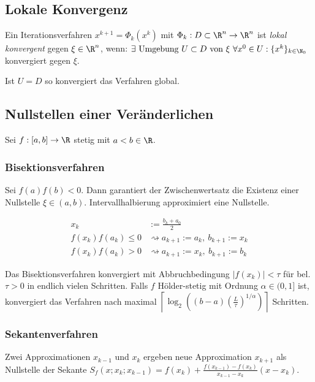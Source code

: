 \subsection*{Lokale Konvergenz}

Ein Iterationsverfahren $x^{k+1} = \Phi_k(x^k)$ mit $\Phi_k : D \subset \R^n \to \R^n$ ist \emph{lokal konvergent} gegen $\xi \in \R^n$, wenn: $\exists \text{ Umgebung } U \subset D \text{ von } \xi \ \forall x^0 \in U : \{x^k\}_{k\in\N_0}$ konvergiert gegen $\xi$.

Ist $U = D$ so konvergiert das Verfahren global.

\subsection*{Nullstellen einer Veränderlichen}

Sei $f : [a,b] \to \R$ stetig mit $a < b \in \R$.

\subsubsection*{Bisektionsverfahren}

Sei $f(a)f(b) < 0$. Dann garantiert der Zwischenwertsatz die Existenz einer Nullstelle $\xi \in (a,b)$. Intervallhalbierung approximiert eine Nullstelle.

\vspace*{-4mm}
\begin{align*}
x_k &:= \frac{b_k+a_0}{2} \\
f(x_k)f(a_k) \leq 0 &\rightsquigarrow a_{k+1} := a_k, \ b_{k+1} := x_k \\
f(x_k)f(a_k) > 0 &\rightsquigarrow a_{k+1} := x_k, \ b_{k+1} := b_k
\end{align*}

Das Bisektionsverfahren konvergiert mit Abbruchbedingung $|f(x_k)| < \tau$ für bel. $\tau > 0$ in endlich vielen Schritten.
Falls $f$ Hölder-stetig mit Ordnung $\alpha \in (0,1]$ ist, konvergiert das Verfahren nach maximal $\left\lceil\log_2((b-a)(\frac{L}{\tau})^{1/\alpha})\right\rceil$ Schritten.

\subsubsection*{Sekantenverfahren}

Zwei Approximationen $x_{k-1}$ und $x_k$ ergeben neue Approximation $x_{k+1}$ als Nullstelle der Sekante $S_f(x;x_k;x_{k-1}) = f(x_k)+\frac{f(x_{k-1})-f(x_k)}{x_{k-1}-x_k} (x-x_k)$.


